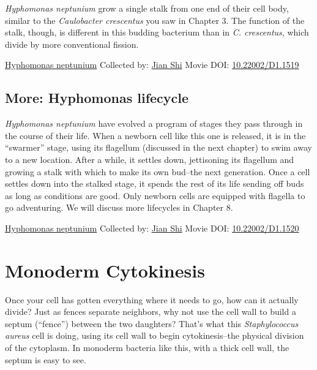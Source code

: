 \documentclass[]{tufte-book}
\begin{document}
\emph{Hyphomonas neptunium} grow a single stalk from one end of their cell body, similar to the \emph{Caulobacter crescentus} you saw in Chapter 3. The function of the stalk, though, is different in this budding bacterium than in \emph{C. crescentus}, which divide by more conventional fission.



\hypertarget{htmlwidget-2b2a1c5df9bc4b267204}{}

\label{fig:5-3a}\protect\hyperlink{tree}{Hyphomonas neptunium} Collected by: \protect\hyperlink{jian_shi}{Jian Shi} Movie DOI: \href{https://doi.org/10.22002/D1.1519}{10.22002/D1.1519}

\hypertarget{Hyphomonas_lifecycle}{%
\subsection*{More: Hyphomonas lifecycle}\label{Hyphomonas_lifecycle}}

\emph{Hyphomonas neptunium} have evolved a program of stages they pass through in the course of their life. When a newborn cell like this one is released, it is in the ``swarmer'' stage, using its flagellum (discussed in the next chapter) to swim away to a new location. After a while, it settles down, jettisoning its flagellum and growing a stalk with which to make its own bud--the next generation. Once a cell settles down into the stalked stage, it spends the rest of its life sending off buds as long as conditions are good. Only newborn cells are equipped with flagella to go adventuring. We will discuss more lifecycles in Chapter 8.



\hypertarget{htmlwidget-9ed154f6503a76f430db}{}

\label{fig:5-3b}\protect\hyperlink{tree}{Hyphomonas neptunium} Collected by: \protect\hyperlink{jian_shi}{Jian Shi} Movie DOI: \href{https://doi.org/10.22002/D1.1520}{10.22002/D1.1520}

\hypertarget{monoderm-cytokinesis}{%
\section{Monoderm Cytokinesis}\label{monoderm-cytokinesis}}

Once your cell has gotten everything where it needs to go, how can it actually divide? Just as fences separate neighbors, why not use the cell wall to build a septum (``fence'') between the two daughters? That's what this \emph{Staphylococcus aureus} cell is doing, using its cell wall to begin cytokinesis--the physical division of the cytoplasm. In monoderm bacteria like this, with a thick cell wall, the septum is easy to see.
\end{document}
